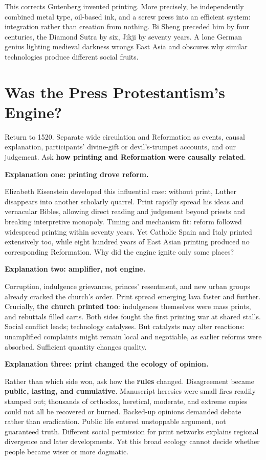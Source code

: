 This corrects Gutenberg invented printing. More precisely, he independently combined metal type, oil-based ink, and a screw press into an efficient system: integration rather than creation from nothing. Bi Sheng preceded him by four centuries, the Diamond Sutra by six, Jikji by seventy years. A lone German genius lighting medieval darkness wrongs East Asia and obscures why similar technologies produce different social fruits.

\section{Was the Press Protestantism's Engine?}
Return to 1520. Separate wide circulation and Reformation as events, causal explanation, participants' divine-gift or devil's-trumpet accounts, and our judgement. Ask \textbf{how printing and Reformation were causally related}.

\textbf{Explanation one: printing drove reform.}

Elizabeth Eisenstein developed this influential case: without print, Luther disappears into another scholarly quarrel. Print rapidly spread his ideas and vernacular Bibles, allowing direct reading and judgement beyond priests and breaking interpretive monopoly. Timing and mechanism fit: reform followed widespread printing within seventy years. Yet Catholic Spain and Italy printed extensively too, while eight hundred years of East Asian printing produced no corresponding Reformation. Why did the engine ignite only some places?

\textbf{Explanation two: amplifier, not engine.}

Corruption, indulgence grievances, princes' resentment, and new urban groups already cracked the church's order. Print spread emerging lava faster and further. Crucially, \textbf{the church printed too}: indulgences themselves were mass prints, and rebuttals filled carts. Both sides fought the first printing war at shared stalls. Social conflict leads; technology catalyses. But catalysts may alter reactions: unamplified complaints might remain local and negotiable, as earlier reforms were absorbed. Sufficient quantity changes quality.

\textbf{Explanation three: print changed the ecology of opinion.}

Rather than which side won, ask how the \textbf{rules} changed. Disagreement became \textbf{public, lasting, and cumulative}. Manuscript heresies were small fires readily stamped out; thousands of orthodox, heretical, moderate, and extreme copies could not all be recovered or burned. Backed-up opinions demanded debate rather than eradication. Public life entered unstoppable argument, not guaranteed truth. Different social permission for print networks explains regional divergence and later developments. Yet this broad ecology cannot decide whether people became wiser or more dogmatic.

